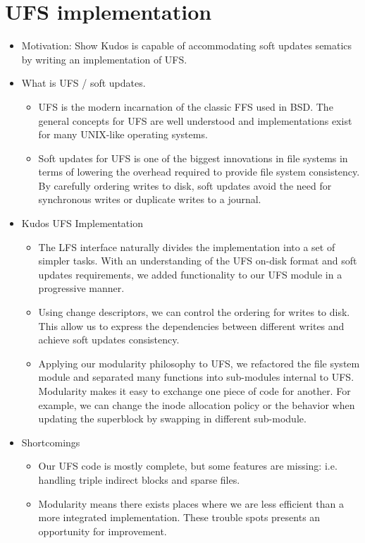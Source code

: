 \documentclass[10pt,twocolumn,letterpaper]{article}
\begin{document}
\section{UFS implementation}
\begin{itemize}
\item Motivation: Show Kudos is capable of accommodating soft updates
  sematics by writing an implementation of UFS.
\item What is UFS / soft updates.
  \begin{itemize}
  \item UFS is the modern incarnation of the classic FFS used in BSD.
    The general concepts for UFS are well understood and implementations
    exist for many UNIX-like operating systems.
  \item Soft updates for UFS is one of the biggest innovations in file
    systems in terms of lowering the overhead required to provide file
    system consistency. By carefully ordering writes to disk, soft updates
    avoid the need for synchronous writes or duplicate writes to a journal.
  \end{itemize}
\item Kudos UFS Implementation
  \begin{itemize}
  \item The LFS interface naturally divides the implementation into a set
    of simpler tasks. With an understanding of the UFS on-disk format and
    soft updates requirements, we added functionality to our UFS module
    in a progressive manner.
  \item Using change descriptors, we can control the ordering for writes
    to disk. This allow us to express the dependencies between different
    writes and achieve soft updates consistency.
  \item Applying our modularity philosophy to UFS, we refactored the file
    system module and separated many functions into sub-modules internal
    to UFS. Modularity makes it easy to exchange one piece of code for
    another. For example, we can change the inode allocation policy or
    the behavior when updating the superblock by swapping in different
    sub-module.
  \end{itemize}
\item Shortcomings
  \begin{itemize}
  \item Our UFS code is mostly complete, but some features are missing:
    i.e. handling triple indirect blocks and sparse files.
  \item Modularity means there exists places where we are less efficient
    than a more integrated implementation. These trouble spots presents
    an opportunity for improvement.
  \end{itemize}
\end{itemize}



\end{document}
